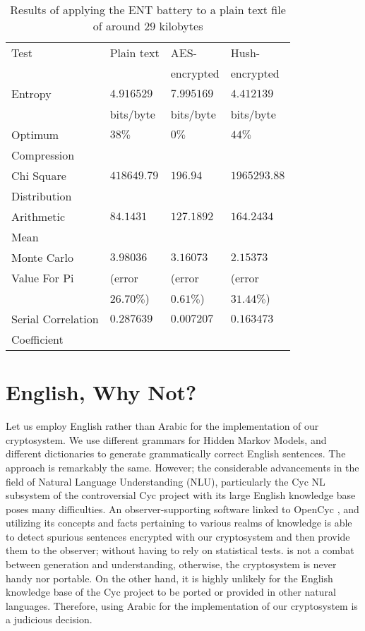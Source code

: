 \documentclass{acm_proc_article-sp}
\begin{document}
\begin{table}
    \centering
    \caption{Results of applying the ENT battery to a plain text file of around $29$ kilobytes}
    \label{Results-of-applying}
    \begin{tabular}{llll}
    \toprule
    Test & Plain text & AES- & Hush- \\
    & & encrypted & encrypted \\
    \midrule
    Entropy & $4.916529$ & $7.995169$ & $4.412139$ \\
    & bits/byte & bits/byte & bits/byte \\

    Optimum & $38\%$ & $0\%$ & $44\%$ \\
    Compression & & & \\

    Chi Square & $418649.79$ & $196.94$ & $1965293.88$ \\
    Distribution & & & \\

    Arithmetic & $84.1431$ & $127.1892$ & $164.2434$ \\
    Mean & & & \\

    Monte Carlo & $3.98036$ & $3.16073$ & $2.15373$ \\
    Value For Pi & (error & (error & (error \\
    & $26.70\%$) & $0.61\%$) & $31.44\%$) \\

    Serial Correlation & $0.287639$ & $0.007207$ & $0.163473$ \\
    Coefficient & & & \\
    \bottomrule
    \end{tabular}
\end{table}

\section{English, Why Not?}\label{English-Why-Not}
Let us employ English rather than Arabic for the implementation of our cryptosystem. We use different grammars for Hidden Markov Models, and different dictionaries to generate grammatically correct English sentences. The approach is remarkably the same. However; the considerable advancements in the field of Natural Language Understanding (NLU), particularly the Cyc NL subsystem \cite{Cycorpa} of the controversial Cyc project with its large English knowledge base poses many difficulties. An observer-supporting software linked to OpenCyc \cite{Cycorp}, and utilizing its concepts and facts pertaining to various realms of knowledge is able to detect spurious sentences encrypted with our cryptosystem and then provide them to the observer; without having to rely on statistical tests. \balancecolumns is not a combat between generation and understanding, otherwise, the cryptosystem is never handy nor portable. On the other hand, it is highly unlikely for the English knowledge base of the Cyc project to be ported or provided in other natural languages. Therefore, using Arabic for the implementation of our cryptosystem is a judicious decision.
\end{document}
